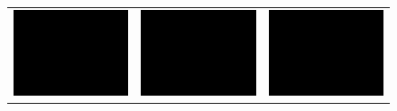 \documentclass[11pt]{report}
\begin{document}
\begin{figure}[H]
\begin{tabular}{ccc}
    \includegraphics[scale=0.1]{images/disparity-opencv-t/disparity_4.png} &
    \includegraphics[scale=0.1]{images/disparity-opencv-d/disparity_4.png} &
    \includegraphics[scale=0.1]{images/disparity-opengv/disparity_4.png} \\

\end{tabular}
\end{figure}
\end{document}

